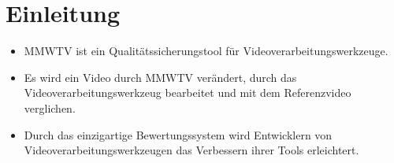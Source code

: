 \chapter{Einleitung}
\begin{itemize}

\item MMWTV ist ein Qualitätssicherungstool für Videoverarbeitungswerkzeuge.
\item Es wird ein Video durch MMWTV verändert, durch das Videoverarbeitungswerkzeug bearbeitet und mit dem Referenzvideo verglichen.
\item Durch das einzigartige Bewertungssystem wird Entwicklern von Videoverarbeitungswerkzeugen
das Verbessern ihrer Tools erleichtert.

\end{itemize}

